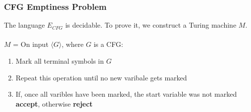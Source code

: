 \documentclass{article}
\begin{document}
\subsubsection{CFG Emptiness Problem}
The language $E_{CFG}$ is decidable. To prove it, we construct a Turing machine $M$. \\ \\
$M$ = On input $\langle G \rangle$, where $G$ is a CFG:

\begin{enumerate}
	\item Mark all terminal symbols in $G$
	\item Repeat this operation until no new varibale gets marked
	\item If, once all varibles have been marked, the start variable was not marked \textbf{accept}, otherwise \textbf{reject}
\end{enumerate}
\end{document}
